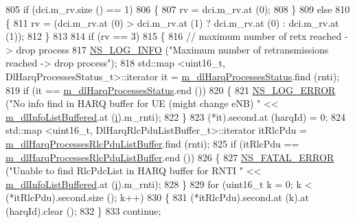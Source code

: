 \begin{DoxyCode}
805           \textcolor{keywordflow}{if} (dci.m\_rv.size () == 1)
806             \{
807               rv = dci.m\_rv.at (0);
808             \}
809           \textcolor{keywordflow}{else}
810             \{
811               rv = (dci.m\_rv.at (0) > dci.m\_rv.at (1) ? dci.m\_rv.at (0) : dci.m\_rv.at (1));
812             \}
813 
814           \textcolor{keywordflow}{if} (rv == 3)
815             \{
816               \textcolor{comment}{// maximum number of retx reached -> drop process}
817               \hyperlink{group__logging_gafbd73ee2cf9f26b319f49086d8e860fb}{NS\_LOG\_INFO} (\textcolor{stringliteral}{"Maximum number of retransmissions reached -> drop process"});
818               std::map <uint16\_t, DlHarqProcessesStatus\_t>::iterator it = 
      \hyperlink{classns3_1_1FdMtFfMacScheduler_a9da9ca73b704b7386f3b751274e1f3e5}{m\_dlHarqProcessesStatus}.find (rnti);
819               \textcolor{keywordflow}{if} (it == \hyperlink{classns3_1_1FdMtFfMacScheduler_a9da9ca73b704b7386f3b751274e1f3e5}{m\_dlHarqProcessesStatus}.end ())
820                 \{
821                   \hyperlink{group__logging_ga0261a8db1d4ac5f79417d117634fd455}{NS\_LOG\_ERROR} (\textcolor{stringliteral}{"No info find in HARQ buffer for UE (might change eNB) "} << 
      \hyperlink{classns3_1_1FdMtFfMacScheduler_ac7f5da1ae0cf374d49f379b07c2c78a7}{m\_dlInfoListBuffered}.at (\hyperlink{bernuolliDistribution_8m_a6f6ccfcf58b31cb6412107d9d5281426}{i}).m\_rnti);
822                 \}
823               (*it).second.at (harqId) = 0;
824               std::map <uint16\_t, DlHarqRlcPduListBuffer\_t>::iterator itRlcPdu =  
      \hyperlink{classns3_1_1FdMtFfMacScheduler_a156b4cd10f41dd79e446a42c469fee02}{m\_dlHarqProcessesRlcPduListBuffer}.find (rnti);
825               \textcolor{keywordflow}{if} (itRlcPdu == \hyperlink{classns3_1_1FdMtFfMacScheduler_a156b4cd10f41dd79e446a42c469fee02}{m\_dlHarqProcessesRlcPduListBuffer}.end ())
826                 \{
827                   \hyperlink{group__fatal_ga5131d5e3f75d7d4cbfd706ac456fdc85}{NS\_FATAL\_ERROR} (\textcolor{stringliteral}{"Unable to find RlcPdcList in HARQ buffer for RNTI "} << 
      \hyperlink{classns3_1_1FdMtFfMacScheduler_ac7f5da1ae0cf374d49f379b07c2c78a7}{m\_dlInfoListBuffered}.at (\hyperlink{bernuolliDistribution_8m_a6f6ccfcf58b31cb6412107d9d5281426}{i}).m\_rnti);
828                 \}
829               \textcolor{keywordflow}{for} (uint16\_t k = 0; k < (*itRlcPdu).second.size (); k++)
830                 \{
831                   (*itRlcPdu).second.at (k).at (harqId).clear ();
832                 \}
833               \textcolor{keywordflow}{continue};

\end{DoxyCode}
